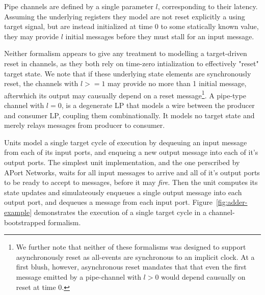 Pipe channels are defined by a single parameter $l$, corresponding to their
latency. Assuming the underlying registers they model are not reset
explicitly a using target signal, but are instead initialized at time 0 to some
statically known value, they may provide $l$ initial messages before they must
stall for an input message.

Neither formalism appears to give any treatment to modelling a target-driven reset in
channels, as they both rely on time-zero intialization to effectively
"reset" target state.  We note that if these underlying state elements are
synchronously reset, the channels with $l >= 1$ may provide no more than 1
initial message, afterwhich its output may causually depend on a reset
message\footnote{We further note that neither of these formalisms was designed
to support asynchronously reset as all-events are synchronous to an implicit
clock. At a first blush, however, asynchronous reset mandates that that even
the first message emitted by a pipe-channel with $l > 0$ would depend causually
on reset at time 0.}. A pipe-type channel with $l = 0$, is a degenerate LP that models a wire between the producer and consumer LP, coupling them combinationally.
It models no target state and merely relays messages from producer to consumer.

Units model a single target cycle of execution by dequeuing an input message
from each of its input ports, and enqueing a new output message into each of
it's output ports. The simplest unit implementation, and the one perscribed by
APort Networks, waits for all input messages to arrive and all of it's output
ports to be ready to accept to messages, before it may \emph{fire}. Then the
unit computes its state updates and simulateously enqueues a single output
message into each output port, and dequeues a message from each input port.
Figure~\ref{fig:adder-example} demonstrates the execution of a single target cycle in a channel-bootstrapped formalism.

